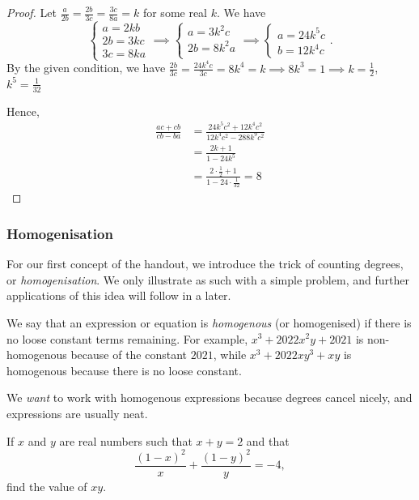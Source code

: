 \documentclass[../jarvis.tex]{subfiles}
\begin{document}
\begin{proof}
    Let $\frac{a}{2b}=\frac{2b}{3c}=\frac{3c}{8a}=k$ for some real $k$. We have
$$ 
\begin{cases}
    a=2kb \\
    2b=3kc \\
    3c=8ka
\end{cases}
\implies
\begin{cases}
    a=3k^2c \\
    2b=8k^2a \\
\end{cases}
\implies
\begin{cases}
    a=24k^5c \\
    b=12k^4c    
\end{cases} 
.$$
By the given condition, we have $\frac{2b}{3c}=\frac{24k^4c}{3c}=8k^4=k \implies 8k^3=1 \implies k=\frac{1}{2}$, $k^5=\frac{1}{32}$

Hence,
\begin{align*}
    \frac{ac+cb}{cb-ba}
    &= \frac{24k^5c^2+12k^4c^2}{12k^4c^2-288k^9c^2} \\
    &= \frac{2k+1}{1-24k^5} \\
    &= \frac{2\cdot\frac{1}{2}+1}{1-24\cdot\frac{1}{32}} = \boxed{8}
\end{align*}
\end{proof}

\subsubsection{Homogenisation}
For our first concept of the handout, we introduce the trick of counting degrees, or \textit{homogenisation}. We only illustrate as such with a simple problem, and further applications of this idea will follow in a later.

\begin{proposition}
    We say that an expression or equation is \textit{homogenous} (or homogenised) if there is no loose constant terms remaining. For example, $x^3+2022x^2y+2021$ is non-homogenous because of the constant $2021$, while $x^3+2022xy^3+xy$ is homogenous because there is no loose constant. 

    We \textit{want} to work with homogenous expressions because degrees cancel nicely, and expressions are usually neat. 
\end{proposition}
\begin{example}
    If $x$ and $y$ are real numbers such that $x+y=2$ and that
    $$\frac{(1-x)^2}{x}+\frac{(1-y)^2}{y}=-4,$$
    find the value of $xy$.
\end{example}
\end{document}
